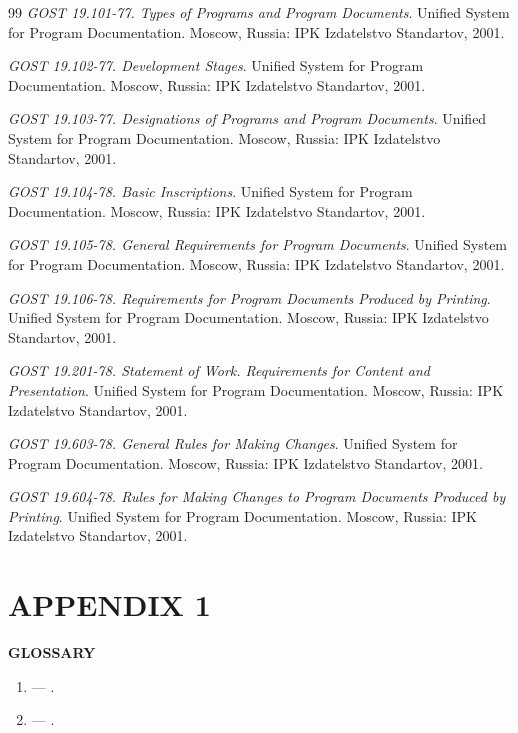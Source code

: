 \documentclass[12pt,a4paper]{extarticle}
\begin{document}
\renewcommand{\refname}{}
\begin{thebibliography}{99}
\emph{GOST 19.101-77. Types of Programs and Program Documents}. Unified System for Program Documentation. Moscow, Russia: IPK Izdatelstvo Standartov, 2001.

\emph{GOST 19.102-77. Development Stages}. Unified System for Program Documentation. Moscow, Russia: IPK Izdatelstvo Standartov, 2001.

\emph{GOST 19.103-77. Designations of Programs and Program Documents}. Unified System for Program Documentation. Moscow, Russia: IPK Izdatelstvo Standartov, 2001.

\emph{GOST 19.104-78. Basic Inscriptions}. Unified System for Program Documentation. Moscow, Russia: IPK Izdatelstvo Standartov, 2001.

\emph{GOST 19.105-78. General Requirements for Program Documents}. Unified System for Program Documentation. Moscow, Russia: IPK Izdatelstvo Standartov, 2001.

\emph{GOST 19.106-78. Requirements for Program Documents Produced by Printing}. Unified System for Program Documentation. Moscow, Russia: IPK Izdatelstvo Standartov, 2001.

\emph{GOST 19.201-78. Statement of Work. Requirements for Content and Presentation}. Unified System for Program Documentation. Moscow, Russia: IPK Izdatelstvo Standartov, 2001.

\emph{GOST 19.603-78. General Rules for Making Changes}. Unified System for Program Documentation. Moscow, Russia: IPK Izdatelstvo Standartov, 2001.

\emph{GOST 19.604-78. Rules for Making Changes to Program Documents Produced by Printing}. Unified System for Program Documentation. Moscow, Russia: IPK Izdatelstvo Standartov, 2001.
\end{thebibliography}

\clearpage

\section*{APPENDIX 1}

\begin{center}
\textbf{GLOSSARY}
\end{center}

\begin{enumerate}[label=\arabic*., leftmargin=1.25cm]
\item \textbf{} --- .
\item \textbf{} --- .
\end{enumerate}

\clearpage



\end{document}
